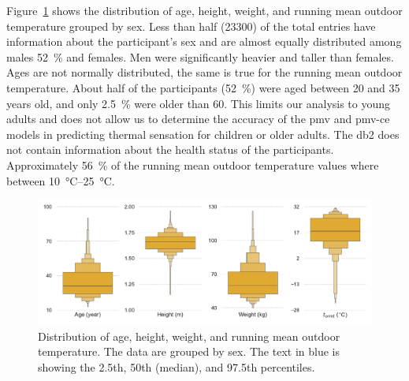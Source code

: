 Figure~\ref{fig:dist_other_data} shows the distribution of age, height, weight, and running mean outdoor temperature grouped by sex.
Less than half (\num{23300}) of the total entries have information about the participant's sex and are almost equally distributed among males \qty{52}{\percent} and females.
Men were significantly heavier and taller than females.
Ages are not normally distributed, the same is true for the running mean outdoor temperature.
About half of the participants (\qty{52}{\percent}) were aged between \num{20} and \num{35} years old, and only \qty{2.5}{\percent} were older than 60.
This limits our analysis to young adults and does not allow us to determine the accuracy of the \ac{pmv} and \ac{pmv-ce} models in predicting thermal sensation for children or older adults.
The \ac{db2} does not contain information about the health status of the participants.
Approximately \qty{56}{\percent} of the running mean outdoor temperature values where between \qtyrange{10}{25}{\celsius}.
\begin{figure}[htb!]
    \centering
    \includegraphics[width=\textwidth]{figures/dist_other_data}
    \caption{Distribution of age, height, weight, and running mean outdoor temperature.
    The data are grouped by sex.
    The text in blue is showing the 2.5th, 50th (median), and 97.5th percentiles.}
    \label{fig:dist_other_data}
\end{figure}
